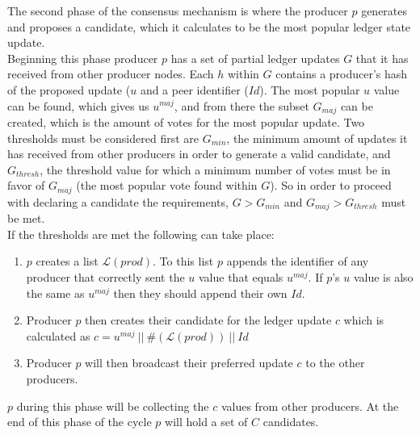 The second phase of the consensus mechanism is where the producer $p$ generates and proposes a candidate, which it calculates to be the most popular ledger state update. \\


Beginning this phase producer $p$ has a set of partial ledger updates $G$ that it has received from other producer nodes. Each $h$ within $G$ contains a producer's hash of the proposed update ($u$ and a peer identifier ($Id$). The most popular $u$ value can be found, which gives us $u^{maj}$, and from there the subset $G_{maj}$ can be created, which is the amount of votes for the most popular update. Two thresholds must be considered first are $G_{min}$, the minimum amount of updates it has received from other producers in order to generate a valid candidate, and $G_{thresh}$, the threshold value for which a minimum number of votes must be in favor of $G_{maj}$ (the most popular vote found within $G$). So in order to proceed with declaring a candidate the requirements, $G > G_{min}$ and $G_{maj} > G_{thresh}$ must be met. \\ 

If the thresholds are met the following can take place:

\begin{enumerate}
\item $p$ creates a list $\mathcal{L}(prod)$. To this list $p$ appends the identifier of any producer that correctly sent the $u$ value that equals $u^{maj}$. If $p$'s $u$ value is also the same as $u^{maj}$ then they should append their own $Id$.
\item Producer $p$ then creates their candidate for the ledger update $c$ which is calculated as $c = u^{maj}~||~\#(\mathcal{L}(prod))~||~Id$
\item Producer $p$ will then broadcast their preferred update $c$ to the other producers.
\end{enumerate}

$p$ during this phase will be collecting the $c$ values from other producers. At the end of this phase of the cycle $p$ will hold a set of $C$ candidates.
